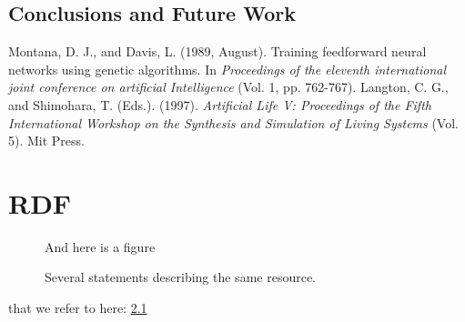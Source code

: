 \documentclass[a4paper,11pt]{kth-mag}
\begin{document}
\section{Conclusions and Future Work}

\begin{thebibliography}{9}
Montana, D. J.,  and Davis, L. (1989, August). Training feedforward neural networks using genetic algorithms. In \emph{Proceedings of the eleventh international joint conference on artificial Intelligence} (Vol. 1, pp. 762-767).
Langton, C. G., and Shimohara, T. (Eds.). (1997). \emph{Artificial Life V: Proceedings of the Fifth International Workshop on the Synthesis and Simulation of Living Systems} (Vol. 5). Mit Press.
\end{thebibliography}

\appendix
\addappheadtotoc
\chapter{RDF}\label{appA}

\begin{figure}[ht]
\begin{center}
And here is a figure
\caption{\small{Several statements describing the same resource.}}\label{RDF_4}
\end{center}
\end{figure}

that we refer to here: \ref{RDF_4}
\end{document}
